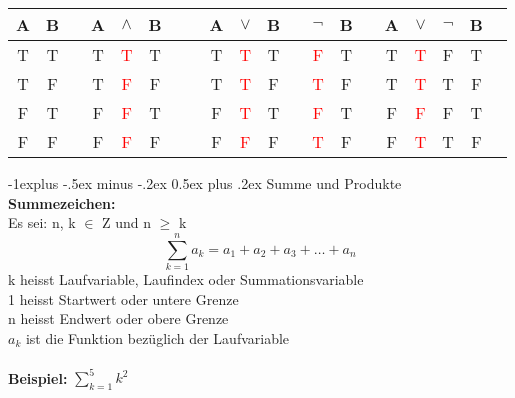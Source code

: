 \documentclass[10pt,landscape]{article}
\makeatletter
\renewcommand{\subsection}{\@startsection{subsection}{2}{0mm}%
                                {-1explus -.5ex minus -.2ex}%
                                {0.5ex plus .2ex}%
                                {\normalfont\normalsize\bfseries}}
\makeatother
\begin{document}
\begin{multicols}{3}
    \begin{tabular}{@{ }c@{ }@{ }c | c@{ }@{ }c@{ }@{ }c@{ }@{ }c@{ }@{ }c | c@{ }@{ }c@{ }@{ }c@{ }@{ }c@{ }@{ }c | c@{ }@{ }c | c@{ }@{ }c@{ }@{ }c@{ }@{ }c@{ }@{ }c@{ }@{ }c}
        A & B &  & A & $\land$            & B &  &  & A & $\lor$             & B &  & $\lnot$            & B &  & A & $\lor$             & $\lnot$ & B & \\
        \hline
        T & T &  & T & \textcolor{red}{T} & T &  &  & T & \textcolor{red}{T} & T &  & \textcolor{red}{F} & T &  & T & \textcolor{red}{T} & F       & T & \\
        T & F &  & T & \textcolor{red}{F} & F &  &  & T & \textcolor{red}{T} & F &  & \textcolor{red}{T} & F &  & T & \textcolor{red}{T} & T       & F & \\
        F & T &  & F & \textcolor{red}{F} & T &  &  & F & \textcolor{red}{T} & T &  & \textcolor{red}{F} & T &  & F & \textcolor{red}{F} & F       & T & \\
        F & F &  & F & \textcolor{red}{F} & F &  &  & F & \textcolor{red}{F} & F &  & \textcolor{red}{T} & F &  & F & \textcolor{red}{T} & T       & F & \\
    \end{tabular}

    \subsection{Summe und Produkte}
    \textbf{Summezeichen:} \\
    Es sei:  n, k $\in$ Z und n $\geq$ k
    \[ \sum_{k=1}^{n} a_k = a_1 + a_2 + a_3 + \ldots + a_n \]
    k heisst Laufvariable, Laufindex oder Summationsvariable \\
    1 heisst Startwert oder untere Grenze \\
    n heisst Endwert oder obere Grenze \\
    $a_{k}$ ist die Funktion bezüglich der Laufvariable \\~\\
    \textbf{Beispiel:}
    $\sum_{k=1}^{5} k^2$


\end{multicols}
\end{document}
